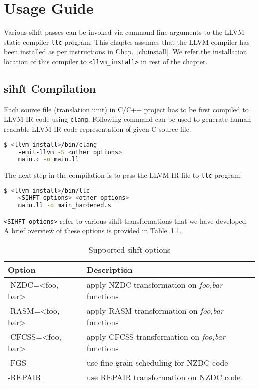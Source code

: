 

\chapter{Usage Guide}

Various \ac{sihft} passes can be invoked via command line arguments to the LLVM static compiler \texttt{llc} program.
This chapter assumes that the LLVM compiler has been installed as per instructions in Chap.~\ref{ch:install}.
We refer the installation location of this compiler to \texttt{<llvm\_install>} in rest of the chapter.

\section{\ac{sihft} Compilation}
Each source file (translation unit) in C/C++ project has to be first compiled to LLVM IR code using \texttt{clang}.
Following command can be used to generate human readable LLVM IR code representation of given C source file.
\begin{framed}
 \begin{lstlisting}[language=bash, basicstyle=\small\ttfamily]
$ <llvm_install>/bin/clang
    -emit-llvm -S <other options>
    main.c -o main.ll
  \end{lstlisting}
\end{framed}

The next step in the compilation is to pass the LLVM IR file to \texttt{llc} program:\\
\begin{lstlisting}[language=bash, basicstyle=\small\ttfamily, frame=single]
$ <llvm_install>/bin/llc
    <SIHFT options> <other options>
    main.ll -o main_hardened.s
\end{lstlisting}

\texttt{<SIHFT options>} refer to various \ac{sihft} transformations that we have developed. A brief overview of these
options is provided in Table~\ref{tab:sihft-options}.

\begin{table}[tb]
 \centering
 \caption{Supported \ac{sihft} options}
 \label{tab:sihft-options}

 \begin{tabular}{|l|l|}
  \hline
  \textbf{Option}                       & \textbf{Description}                                     \\
  \hline
  -NZDC=\textless foo, bar\textgreater  & apply NZDC transformation on \textit{foo,bar} functions  \\
  -RASM=\textless foo, bar\textgreater  & apply RASM transformation on \textit{foo,bar} functions  \\
  -CFCSS=\textless foo, bar\textgreater & apply CFCSS transformation on \textit{foo,bar} functions \\
  -FGS                                  & use fine-grain scheduling for NZDC code                  \\
  -REPAIR                               & use REPAIR transformation on NZDC code                   \\
  \hline
 \end{tabular}
\end{table}


